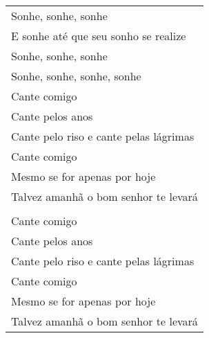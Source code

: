 \begin{longtable}{@{}l@{}}
Sonhe, sonhe, sonhe                                    \\
E sonhe até que seu sonho se realize                   \\
Sonhe, sonhe, sonhe                                    \\
Sonhe, sonhe, sonhe, sonhe                             \\
Cante comigo                                           \\
Cante pelos anos                                       \\
Cante pelo riso e cante pelas lágrimas                 \\
Cante comigo                                           \\
Mesmo se for apenas por hoje                           \\
Talvez amanhã o bom senhor te levará                   \\
                                                       \\
Cante comigo                                           \\
Cante pelos anos                                       \\
Cante pelo riso e cante pelas lágrimas                 \\
Cante comigo                                           \\
Mesmo se for apenas por hoje                           \\
Talvez amanhã o bom senhor te levará                   \\* \bottomrule
\end{longtable}
